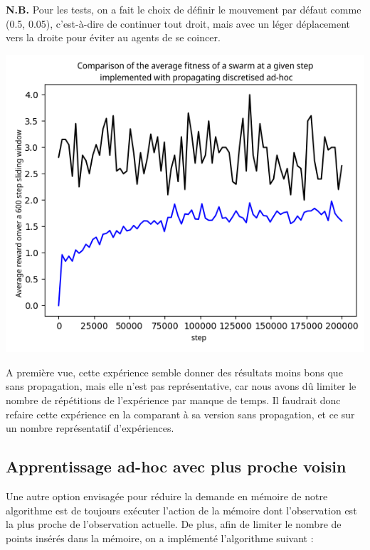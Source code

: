 \documentclass[a4paper, 12pt]{report}
\begin{document}
	
	\textbf{N.B.} Pour les tests, on a fait le choix de définir le mouvement par défaut comme (0.5, 0.05), c'est-à-dire de continuer tout droit, mais avec un léger déplacement vers la droite pour éviter au agents de se coincer.

\begin{center}
	\includegraphics{D2Propag}
\end{center}	
A première vue, cette expérience semble donner des résultats moins bons que sans propagation, mais elle n'est pas représentative, car nous avons dû limiter le nombre de répétitions de l'expérience par manque de temps. Il faudrait donc refaire cette expérience en la comparant à sa version sans propagation, et ce sur un nombre représentatif d'expériences.
	
	
	\subsection{Apprentissage ad-hoc avec plus proche voisin}
	Une autre option envisagée pour réduire la demande en mémoire de notre algorithme est de toujours exécuter l'action de la mémoire dont l'observation est la plus proche de l'observation actuelle.
	De plus, afin de limiter le nombre de points insérés dans la mémoire, on a implémenté l'algorithme suivant :

	
\end{document}
